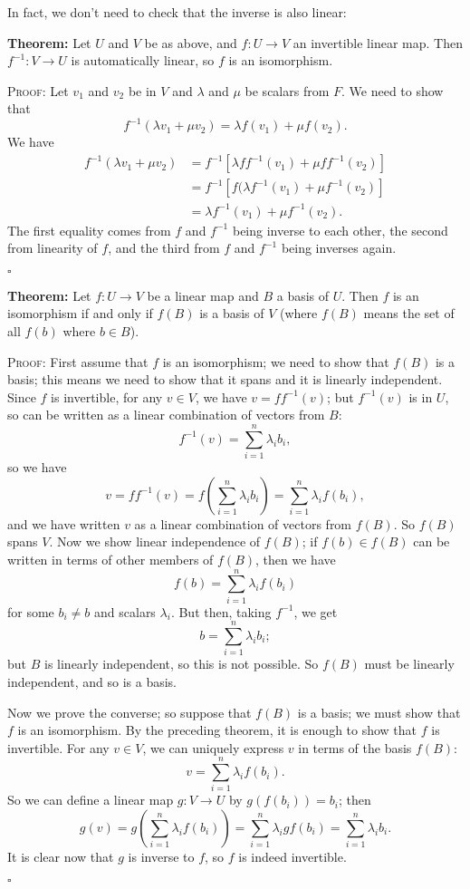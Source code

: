 \documentclass{article}
\newcommand{\qed}{{}\par\hfill$\square$\bigskip}
\let\lamdba\lambda
\begin{document}
In fact, we don't need to check that the inverse is also linear:\medskip

\textbf{Theorem:}
Let $U$ and $V$ be as above, and $f:U\to V$ an invertible linear map. Then $f^{-1}:V\to U$ is automatically linear, so $f$ is an isomorphism.\medskip

\textsc{Proof:}
Let $v_1$ and $v_2$ be in $V$ and $\lambda$ and $\mu$ be scalars from $F$. We need to show that
\[f^{-1}(\lambda v_1+\mu v_2)=\lambda f(v_1)+\mu f(v_2).\]
We have
\begin{align*}
	f^{-1}(\lambda v_1+\mu v_2)&=f^{-1}\left[\lambda ff^{-1}(v_1) + \mu ff^{-1}(v_2)\right]\\
	&=f^{-1}\left[f(\lambda f^{-1}(v_1)+\mu f^{-1}(v_2)\right]\\
	&= \lambda f^{-1}(v_1)+\mu f^{-1}(v_2).
\end{align*}
The first equality comes from $f$ and $f^{-1}$ being inverse to each other, the second from linearity of $f$, and the third from $f$ and $f^{-1}$ being inverses again.\qed


\textbf{Theorem:}
Let $f:U\to V$ be a linear map and $B$ a basis of $U$. Then $f$ is an isomorphism if and only if $f(B)$ is a basis of $V$ (where $f(B)$ means the set of all $f(b)$ where $b\in B$).\medskip

\textsc{Proof:}
First assume that $f$ is an isomorphism; we need to show that $f(B)$ is a basis; this means we need to show that it spans and it is linearly independent. Since $f$ is invertible, for any $v\in V$, we have $v=ff^{-1}(v)$; but $f^{-1}(v)$ is in $U$, so can be written as a linear combination of vectors from $B$:
\[f^{-1}(v)=\sum_{i=1}^n \lambda _i b_i,\]
so we have
\[v=ff^{-1}(v)=f\left(\sum_{i=1}^n \lambda_i b_i\right)=\sum_{i=1}^n \lambda_i f(b_i),\]
and we have written $v$ as a linear combination of vectors from $f(B)$. So $f(B)$ spans $V$. Now we show linear independence of $f(B)$; if $f(b)\in f(B)$ can be written in terms of other members of $f(B)$, then we have
\[f(b)=\sum_{i=1}^n \lambda_i f(b_i)\]
for some $b_i\neq b$ and scalars $\lamdba_i$. But then, taking $f^{-1}$, we get
\[b=\sum_{i=1}^n \lambda_i b_i;\]
but $B$ is linearly independent, so this is not possible. So $f(B)$ must be linearly independent, and so is a basis.

Now we prove the converse; so suppose that $f(B)$ is a basis; we must show that $f$ is an isomorphism. By the preceding theorem, it is enough to show that $f$ is invertible. For any $v\in V$, we can uniquely express $v$ in terms of the basis $f(B)$:
\[v=\sum_{i=1}^n \lambda_i f(b_i).\]
So we can define a linear map $g:V\to U$ by $g(f(b_i))=b_i$; then
\[g(v)=g\left(\sum_{i=1}^n \lambda_i f(b_i)\right)=\sum_{i=1}^n \lambda_i gf(b_i)=\sum_{i=1}^n \lambda_i b_i.\]
It is clear now that $g$ is inverse to $f$, so $f$ is indeed invertible.\qed
\end{document}
